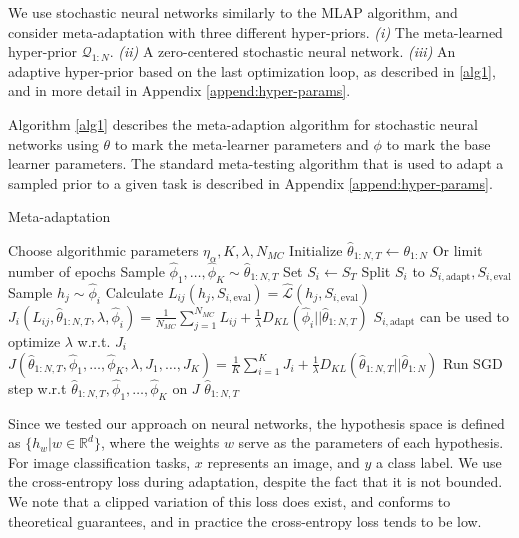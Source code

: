 \documentclass{article} %
\theoremstyle{definition}
\begin{document}
We use stochastic neural networks \citep{Graves2011, Blundell2015} similarly to the MLAP \citep{Amit2018} algorithm, and consider meta-adaptation with three different hyper-priors. \emph{(i)} The meta-learned hyper-prior $\mathcal{Q}_{1:N}$. \emph{(ii)} A zero-centered stochastic neural network. \emph{(iii)}  An adaptive hyper-prior based on the last optimization loop, as described in \ref{alg1}, and in more detail in  Appendix \ref{append:hyper-params}. 

Algorithm \ref{alg1} describes the meta-adaption algorithm for stochastic neural networks using $\theta$ to mark the meta-learner parameters and $\phi$ to mark the base learner parameters. The standard meta-testing algorithm that is used to adapt a sampled prior to a given task is described in Appendix \ref{append:hyper-params}.

\begin{algorithm}[H]
	\caption{Meta-adaptation}
	\label{alg1}
	\small
	\begin{algorithmic}
		\State Choose algorithmic parameters $\eta_\alpha, K, \lambda, N_{MC}$
		\State Initialize $\hat{\theta}_{1:N, T}\leftarrow \theta_{1:N}$
		 \Comment Or limit number of epochs
		\State Sample $\hat{\phi}_1,\ldots,\hat{\phi}_K\sim \hat{\theta}_{1:N, T}$
		\State Set $S_i\leftarrow S_T$
		\State Split $S_i$ to $S_{i,\mathrm{adapt}},S_{i,\mathrm{eval}}$
		\State Sample $h_j\sim \hat{\phi}_i$
		\State Calculate $L_{ij}(h_j, S_{i,\mathrm{eval}})=\hat{\mathcal{L}}(h_j,S_{i,\mathrm{eval}})$
		\EndFor 
		\State $J_i(L_{ij}, \hat{\theta}_{1:N, T}, \lambda,\hat{\phi}_i )=\frac{1}{N_{MC}}\sum_{j=1}^{N_{MC}}L_{ij}+\frac{1}{\lambda} D_{KL}(\hat{\phi}_i||\hat{\theta}_{1:N,T})$ \Comment $S_{i,\mathrm{adapt}}$ can be used to optimize $\lambda$ w.r.t. $J_i$
		\EndFor
		\State $J(\hat{\theta}_{1:N,T}, \hat{\phi}_1,\ldots,\hat{\phi}_K, \lambda, J_1,\ldots,J_K)=\frac{1}{K}\sum_{i=1}^{K}J_i + \frac{1}{\lambda} D_{KL}(\hat{\theta}_{1:N, T}||\hat{\theta}_{1:N})$
		\State  Run SGD step w.r.t $\hat{\theta}_{1:N, T},\hat{\phi}_1,\ldots,\hat{\phi}_K$ on $J$
		\EndWhile
		\State \Return $\hat{\theta}_{1:N, T}$
		\EndFunction
	\end{algorithmic}
\end{algorithm}

Since we tested our approach on neural networks, the hypothesis space is defined as $\{h_w|w\in \mathbb{R}^d\}$, where the weights $w$ serve as the parameters of each hypothesis.
For image classification tasks, $x$ represents an image, and $y$ a class label. 
We use the cross-entropy loss during adaptation, despite the fact that it is not bounded. We note that a clipped variation of this loss does exist, and conforms to theoretical guarantees, and in practice the cross-entropy loss tends to be low.
\end{document}
